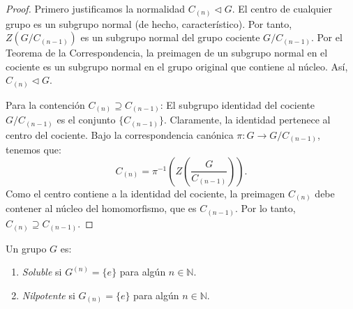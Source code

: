 \begin{proof}
    Primero justificamos la normalidad $C_{(n)} \triangleleft G$.
    El centro de cualquier grupo es un subgrupo normal (de hecho, característico). Por tanto, $Z(G/C_{(n-1)})$ es un subgrupo normal del grupo cociente $G/C_{(n-1)}$.
    Por el Teorema de la Correspondencia, la preimagen de un subgrupo normal en el cociente es un subgrupo normal en el grupo original que contiene al núcleo.
    Así, $C_{(n)} \triangleleft G$.
    
    Para la contención $C_{(n)} \supseteq C_{(n-1)}$:
    El subgrupo identidad del cociente $G/C_{(n-1)}$ es el conjunto $\{C_{(n-1)}\}$.
    Claramente, la identidad pertenece al centro del cociente.
    Bajo la correspondencia canónica $\pi: G \to G/C_{(n-1)}$, tenemos que:
    \begin{equation*}
        C_{(n)} = \pi^{-1}\left( Z\left(\frac{G}{C_{(n-1)}}\right) \right).
    \end{equation*}
    Como el centro contiene a la identidad del cociente, la preimagen $C_{(n)}$ debe contener al núcleo del homomorfismo, que es $C_{(n-1)}$.
    Por lo tanto, $C_{(n)} \supseteq C_{(n-1)}$.
\end{proof}

\begin{defi}
    Un grupo $G$ es:
    \begin{enumerate}
        \item \emph{Soluble} si $G^{(n)} = \{e\}$ para algún $n \in \mathbb{N}$.
        \item \emph{Nilpotente} si $G_{(n)} = \{e\}$ para algún $n \in \mathbb{N}$.
    \end{enumerate}
\end{defi}


